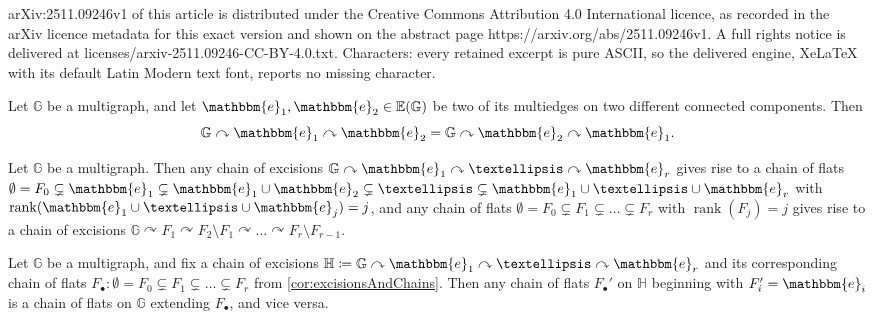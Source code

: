 \documentclass[10pt,a4paper]{amsart}
\DeclareMathOperator{\rank}{rank}
\newcommand{\EE}{\mathbb{E}}
\newcommand{\GG}{\mathbb{G}}
\newcommand{\HH}{\mathbb{H}}
\newcommand{\ee}{\mathbbm{e}}
\begin{document}
arXiv:2511.09246v1 of this article is distributed under the Creative Commons Attribution 4.0 International licence, as recorded in the arXiv licence metadata for this exact version and shown on the abstract page https://arxiv.org/abs/2511.09246v1. A full rights notice is delivered at licenses/arxiv-2511.09246-CC-BY-4.0.txt. Characters: every retained excerpt is pure ASCII, so the delivered engine, XeLaTeX with its default Latin Modern text font, reports no missing character.
\begin{lemma}
  \label{lem:excisionsCommuting}
  Let $\GG$ be a multigraph, and let $\ee_1,\ee_2\in\EE(\GG)$ be two of its multiedges on two different connected components.  Then
  \begin{equation*}
    \GG\curvearrowright\ee_1\curvearrowright\ee_2 = \GG\curvearrowright\ee_2\curvearrowright\ee_1.
  \end{equation*}
\end{lemma}

\begin{corollary}
  \label{cor:excisionsAndChains}
  Let $\GG$ be a multigraph.  Then any chain of excisions $\GG\curvearrowright\ee_1\curvearrowright\dots\curvearrowright\ee_r$ gives rise to a chain of flats $\emptyset = F_0\subsetneq \ee_1 \subsetneq \ee_1\cup \ee_2 \subsetneq\dots\subsetneq \ee_1\cup\dots\cup\ee_r$ with $\rank(\ee_1\cup\dots\cup\ee_j)=j$, and any chain of flats $\emptyset=F_0\subsetneq F_1\subsetneq\dots\subsetneq F_r$ with $\rank(F_j)=j$ gives rise to a chain of excisions $\GG\curvearrowright F_1\curvearrowright F_2\setminus F_1\curvearrowright \dots\curvearrowright F_r\setminus F_{r-1}$.
\end{corollary}

\begin{corollary}
  \label{cor:excisionsAndChains2}
  Let $\GG$ be a multigraph, and fix a chain of excisions $\HH\coloneqq \GG\curvearrowright\ee_1\curvearrowright\dots\curvearrowright\ee_r$ and its corresponding chain of flats $F_\bullet\colon \emptyset=F_0\subsetneq F_1\subsetneq\dots\subsetneq F_r$ from \cref{cor:excisionsAndChains}.  Then any chain of flats $F_\bullet'$ on $\HH$ beginning with $F_{i}'=\ee_i$ is a chain of flats on $\GG$ extending $F_\bullet$, and vice versa.
\end{corollary}
\end{document}
